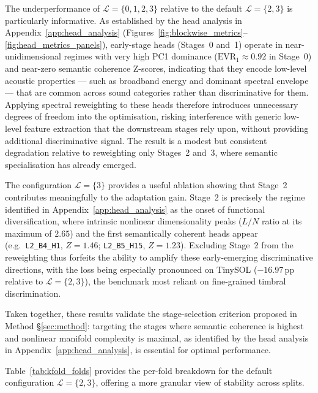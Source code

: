 The underperformance of $\mathcal{L}=\{0,1,2,3\}$ relative to the default 
$\mathcal{L}=\{2,3\}$ is particularly informative. 
As established by the head analysis in Appendix~\ref{app:head_analysis} 
(Figures~\ref{fig:blockwise_metrics}--\ref{fig:head_metrics_panels}), 
early-stage heads (Stages~0 and~1) operate in near-unidimensional regimes 
with very high PC1 dominance ($\mathrm{EVR}_1 \approx 0.92$ in Stage~0) 
and near-zero semantic coherence Z-scores, indicating that they encode 
low-level acoustic properties --- such as broadband energy and dominant 
spectral envelope --- that are common across sound categories rather than 
discriminative for them. 
Applying spectral reweighting to these heads therefore introduces 
unnecessary degrees of freedom into the optimisation, risking interference 
with generic low-level feature extraction that the downstream stages rely 
upon, without providing additional discriminative signal. 
The result is a modest but consistent degradation relative to reweighting 
only Stages~2 and~3, where semantic specialisation has already emerged.

The configuration $\mathcal{L}=\{3\}$ provides a useful ablation showing 
that Stage~2 contributes meaningfully to the adaptation gain. 
Stage~2 is precisely the regime identified in Appendix~\ref{app:head_analysis} 
as the onset of functional diversification, where intrinsic nonlinear 
dimensionality peaks ($L/N$ ratio at its maximum of $2.65$) and the first 
semantically coherent heads appear 
(e.g.\ \texttt{L2\_B4\_H1}, $Z=1.46$; \texttt{L2\_B5\_H15}, $Z=1.23$). 
Excluding Stage~2 from the reweighting thus forfeits the ability to amplify 
these early-emerging discriminative directions, with the loss being 
especially pronounced on TinySOL ($-16.97$\,pp relative to 
$\mathcal{L}=\{2,3\}$), the benchmark most reliant on fine-grained timbral 
discrimination.

Taken together, these results validate the stage-selection criterion 
proposed in Method \S\ref{sec:method}: targeting the stages where semantic 
coherence is highest and nonlinear manifold complexity is maximal, as 
identified by the head analysis in Appendix~\ref{app:head_analysis}, is
essential for 
optimal performance.

Table~\ref{tab:kfold_folds} provides the per-fold breakdown for the 
default configuration $\mathcal{L}=\{2,3\}$, offering a more granular 
view of stability across splits.

